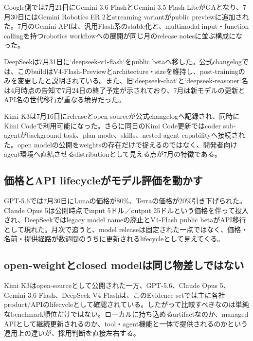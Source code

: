 Google側では7月21日にGemini 3.6 FlashとGemini 3.5 Flash-LiteがGAとなり、7月30日にはGemini Robotics ER 2とstreaming variantがpublic previewに追加された。7月のGemini APIは、汎用Flash系のstable化と、multimodal input・function callingを持つrobotics workflowへの展開が同じ月のrelease notesに並ぶ構成になった。\autocite{src-a24fd97eb3d0}


DeepSeekは7月31日に`deepseek-v4-flash`をpublic betaへ移した。公式changelogでは、このbuildはV4-Flash-Previewとarchitecture・sizeを維持し、post-trainingのみを変更したと説明されている。また、旧`deepseek-chat`と`deepseek-reasoner`名は4月時点の告知で7月24日の終了予定が示されており、7月は新モデルの更新とAPI名の世代移行が重なる境界だった。\autocite{src-e547d0d8cbe3}


Kimi K3は7月16日にreleaseとopen-sourceが公式changelogへ記録され、同時にKimi Codeで利用可能になった。さらに同日のKimi Code更新ではcoder sub-agentがbackground task、plan mode、skills、nested-agent capabilityへ接続された。open modelの公開をweightsの存在だけで捉えるのではなく、開発者向けagent環境へ直結させるdistributionとして見える点が7月の特徴である。\autocite{src-9191d43918fc}


\subsection{価格とAPI lifecycleがモデル評価を動かす}

GPT-5.6では7月30日にLunaの価格が80\%、Terraの価格が20\%引き下げられた。Claude Opus 5は公開時点でinput 5ドル／output 25ドルという価格を伴って投入され、DeepSeekではlegacy model nameの廃止とV4-Flash public betaがAPI移行として現れた。月次で追うと、model releaseは固定された一点ではなく、価格・名前・提供経路が数週間のうちに更新されるlifecycleとして見えてくる。\autocite{src-dca7adc62d79,src-e19fbb75eb44,src-e547d0d8cbe3,src-f6aa679babd7}


\subsection{open-weightとclosed modelは同じ物差しではない}

Kimi K3はopen-sourceとして公開された一方、GPT-5.6、Claude Opus 5、Gemini 3.6 Flash、DeepSeek V4-Flashは、このEvidence setでは主に各社product/APIのlifecycleとして確認されている。したがって比較すべきなのは単純なbenchmark順位だけではない。ローカルに持ち込めるartifactなのか、managed APIとして継続更新されるのか、tool・agent機能と一体で提供されるのかという運用上の違いが、採用判断を直接左右する。\autocite{src-9191d43918fc,src-a24fd97eb3d0,src-e19fbb75eb44,src-e547d0d8cbe3,src-f6aa679babd7}


